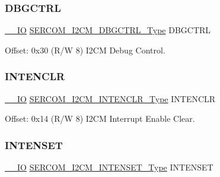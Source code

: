 \mbox{\label{struct_sercom_i2cm_aa3a63d86d50abbc08fd0afa89947443d}} 
\subsubsection{\texorpdfstring{DBGCTRL}{DBGCTRL}}
{\footnotesize\ttfamily \mbox{\hyperlink{core__cm0plus_8h_aec43007d9998a0a0e01faede4133d6be}{\+\_\+\+\_\+\+IO}} \mbox{\hyperlink{union_s_e_r_c_o_m___i2_c_m___d_b_g_c_t_r_l___type}{S\+E\+R\+C\+O\+M\+\_\+\+I2\+C\+M\+\_\+\+D\+B\+G\+C\+T\+R\+L\+\_\+\+Type}} D\+B\+G\+C\+T\+RL}



Offset\+: 0x30 (R/W 8) I2\+CM Debug Control. 

\mbox{\label{struct_sercom_i2cm_ada791d3665c1160b474eb29b5bd8f66d}} 
\subsubsection{\texorpdfstring{INTENCLR}{INTENCLR}}
{\footnotesize\ttfamily \mbox{\hyperlink{core__cm0plus_8h_aec43007d9998a0a0e01faede4133d6be}{\+\_\+\+\_\+\+IO}} \mbox{\hyperlink{union_s_e_r_c_o_m___i2_c_m___i_n_t_e_n_c_l_r___type}{S\+E\+R\+C\+O\+M\+\_\+\+I2\+C\+M\+\_\+\+I\+N\+T\+E\+N\+C\+L\+R\+\_\+\+Type}} I\+N\+T\+E\+N\+C\+LR}



Offset\+: 0x14 (R/W 8) I2\+CM Interrupt Enable Clear. 

\mbox{\label{struct_sercom_i2cm_a7ff0107c756828cd8350f89bd9debc87}} 
\subsubsection{\texorpdfstring{INTENSET}{INTENSET}}
{\footnotesize\ttfamily \mbox{\hyperlink{core__cm0plus_8h_aec43007d9998a0a0e01faede4133d6be}{\+\_\+\+\_\+\+IO}} \mbox{\hyperlink{union_s_e_r_c_o_m___i2_c_m___i_n_t_e_n_s_e_t___type}{S\+E\+R\+C\+O\+M\+\_\+\+I2\+C\+M\+\_\+\+I\+N\+T\+E\+N\+S\+E\+T\+\_\+\+Type}} I\+N\+T\+E\+N\+S\+ET}



